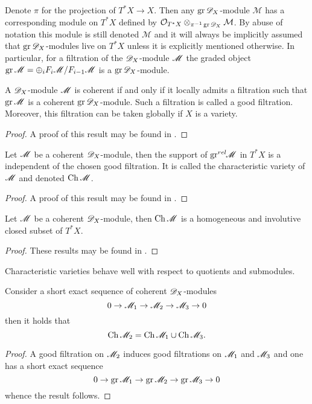 Denote $\pi$ for the projection of $T^*X \to X$.
Then any $\operatorname{gr}\mathscr{D}_X$-module $\mathcal{M}$ has a corresponding module on $T^* X$ defined by $\mathcal{O}_{T^*X} \otimes_{\pi^{-1}\operatorname{gr} \mathscr{D}_X} \mathcal{M}$.
By abuse of notation this module is still denoted $\mathcal{M}$ and it will always be implicitly assumed that $\operatorname{gr} \mathscr{D}_X$-modules live on $T^*X$ unless it is explicitly mentioned otherwise.
In particular, for a filtration of the $\mathscr{D}_X$-module $\mathscr{M}$ the graded object $\operatorname{gr} \mathscr{M} = \oplus_i F_i \mathscr{M} / F_{i-1}\mathscr{M}$ is a $\operatorname{gr} \mathscr{D}_X$-module.

\begin{proposition}\label{prop: GoodFiltration}
  A $\mathscr{D}_X$-module $\mathscr{M}$ is coherent if and only if it locally admits a filtration such that $\operatorname{gr} \mathscr{M}$ is a coherent $\operatorname{gr} \mathscr{D}_X$-module. Such a filtration is called a good filtration. Moreover, this filtration can be taken globally if $X$ is a variety.
\end{proposition}
\begin{proof}
  A proof of this result may be found in \cite[Chapter 2]{hotta2007d}.
\end{proof}
\begin{proposition}
  Let $\mathscr{M}$ be a coherent $\mathscr{D}_X$-module, then the support of $\operatorname{gr}^{rel}\mkern-5mu\mathscr{M}$ in $T^* X$ is a independent of the chosen good filtration. It is called the characteristic variety of $\mathscr{M}$ and denoted $\operatorname{Ch} \mathscr{M}$.
\end{proposition}
\begin{proof}
  A proof of this result may be found in \cite[Chapter 2]{hotta2007d}.
\end{proof}
\begin{proposition}\label{prop: StructureChVar}
  Let $\mathscr{M}$ be a coherent $\mathscr{D}_X$-module, then $\operatorname{Ch} \mathscr{M}$ is a homogeneous and involutive closed subset of $T^* X$.
\end{proposition}
\begin{proof}
  These results may be found in \cite[Chapter 2]{kashiwara2003d}.
\end{proof}
Characteristic varieties behave well with respect to quotients and submodules.
\begin{proposition}\label{prop: SESBehaviourChar}
  Consider a short exact sequence of coherent $\mathscr{D}_X$-modules
  $$0 \to \mathscr{M}_1 \to \mathscr{M}_2 \to \mathscr{M}_3 \to 0 $$
  then it holds that
  $$\operatorname{Ch} \mathscr{M}_2 = \operatorname{Ch} \mathscr{M}_1 \cup \operatorname{Ch} \mathscr{M}_3. $$
\end{proposition}
\begin{proof}
  A good filtration on $\mathscr{M}_2$ induces good filtrations on $\mathscr{M}_1$ and $\mathscr{M}_3$ and one has a short exact sequence
  $$0\to \operatorname{gr} \mathscr{M}_1 \to \operatorname{gr} \mathscr{M}_2 \to \operatorname{gr} \mathscr{M}_3 \to 0 $$
  whence the result follows.
\end{proof}
